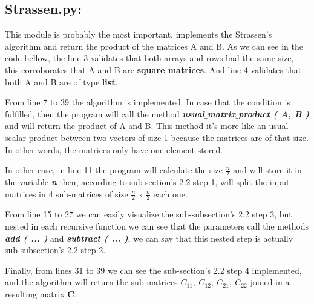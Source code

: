 \subsection{Strassen.py:}

{\small This module is probably the most important, implements the Strassen's algorithm and return the product of the matrices A and B. As we can see in the code bellow, the line 3 validates that both arrays and rows had the same size, this corroborates that A and B are {\bfseries square matrices}. And line 4 validates that both A and B are of type {\bfseries list}. \hfill \break

From line 7 to 39 the algorithm is implemented. In case that the condition is fulfilled, then the program will call the method {\bfseries\itshape usual$\_$matrix$\_$product ( A, B )} and will return the product of A and B. This method it's more like an usual scalar product between two vectors of size 1 because the matrices are of that size. In other words, the matrices only have one element stored. \hfill \break

{\bfseries\itshape\color{carmine}{Observation:}} {\itshape\color{carmine}{It's negligible which matrix is evaluated in the if condition since both are of the same size.}} \hfill \break

In other case, in line 11 the program will calculate the size $\frac{n}{2}$ and will store it in the variable {\bfseries\itshape n} then, according to sub-section's 2.2 step 1, will split the input matrices in 4 sub-matrices of size $\frac{n}{2}$ x $\frac{n}{2}$ each one. \hfill \break

From line 15 to 27 we can easily visualize the sub-subsection's 2.2 step 3, but nested in each recursive function we can see that the parameters call the methods {\bfseries\itshape add ( ... )} and {\bfseries\itshape subtract ( ... )}, we can say that this nested step is actually sub-subsection's 2.2 step 2. \hfill \break

{\bfseries\itshape\color{carmine}{Observation:}} {\itshape\color{carmine}{The recursive functions may be in different order than the ones in sub-section 2.2, but are the same.}} \hfill \break

Finally, from lines 31 to 39 we can see the sub-section's 2.2 step 4 implemented, and the algorithm will return the sub-matrices $C_{11},\ C_{12},\ C_{21},\ C_{22}$ joined in a resulting matrix {\bfseries C}. \hfill \break}

